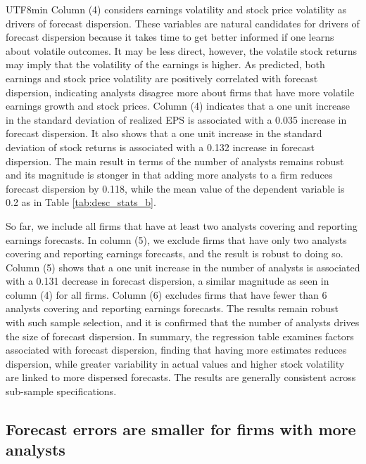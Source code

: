 \documentclass[12pt, a4paper]{article}
\begin{document}
\begin{CJK}{UTF8}{min}
Column (4) considers earnings volatility and stock price volatility as drivers of forecast dispersion.
These variables are natural candidates for drivers of forecast dispersion because it takes time to get better informed if one learns about volatile outcomes.
It may be less direct, however, the volatile stock returns may imply that the volatility of the earnings is higher.
As predicted, both earnings and stock price volatility are positively correlated with forecast dispersion, indicating analysts disagree more about firms that have more volatile earnings growth and stock prices.
Column (4) indicates that a one unit increase in the standard deviation of realized EPS is associated with a 0.035 increase in forecast dispersion.
It also shows that a one unit increase in the standard deviation of stock returns is associated with a 0.132 increase in forecast dispersion.
The main result in terms of the number of analysts remains robust and its magnitude is stonger in that adding more analysts to a firm reduces forecast dispersion by 0.118, 
while the mean value of the dependent variable is 0.2 as in Table \ref{tab:desc_stats_b}.

So far, we include all firms that have at least two analysts covering and reporting earnings forecasts.
In column (5), we exclude firms that have only two analysts covering and reporting earnings forecasts, and the result is robust to doing so.
Column (5) shows that a one unit increase in the number of analysts is associated with a 0.131 decrease in forecast dispersion, a similar magnitude as seen in column (4) for all firms.
Column (6) excludes firms that have fewer than 6 analysts covering and reporting earnings forecasts.
The results remain robust with such sample selection, and it is confirmed that the number of analysts drives the size of forecast dispersion.
In summary, the regression table examines factors associated with forecast dispersion, finding that having more estimates reduces dispersion, while greater variability in actual values and higher stock volatility are linked to more dispersed forecasts. The results are generally consistent across sub-sample specifications.





\subsection{Forecast errors are smaller for firms with more analysts}


\end{CJK}
\end{document}
